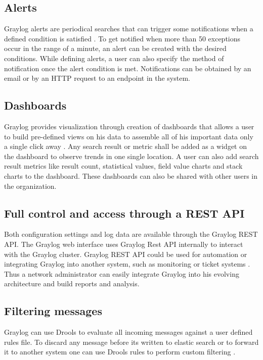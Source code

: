 \documentclass[9pt,twocolumn,twoside]{../../styles/osajnl}
\begin{document}
\subsection{Alerts}

Graylog alerts are periodical searches that can trigger some
notifications when a defined condition is satisfied
\cite{www-graylog-alerts}. To get notified when more than 50
exceptions occur in the range of a minute, an alert can be created
with the desired conditions.  While defining alerts, a user can also
specify the method of notification once the alert condition is
met. Notifications can be obtained by an email or by an HTTP request
to an endpoint in the system.

\subsection{Dashboards}

Graylog provides visualization through creation of dashboards that
allows a user to build pre-defined views on his data to assemble all
of his important data only a single click away
\cite{www-graylog-dashboards}. Any search result or metric shall be
added as a widget on the dashboard to observe trends in one single
location.  A user can also add search result metrics like result
count, statistical values, field value charts and stack charts to the
dashboard. These dashboards can also be shared with other users in the
organization.

\subsection{Full control and access through a REST API}

Both configuration settings and log data are available through the
Graylog REST API.  The Graylog web interface uses Graylog Rest API
internally to interact with the Graylog cluster. Graylog REST API
could be used for automation or integrating Graylog into another
system, such as monitoring or ticket systems
\cite{www-graylog-restapi}. Thus a network administrator can easily
integrate Graylog into his evolving architecture and build reports and
analysis.

\subsection{Filtering messages}

Graylog can use Drools \CE to evaluate all incoming messages against a
user defined rules file. To discard any message before its written to
elastic search or to forward it to another system one can use Drools
rules to perform custom filtering \cite{www-graylog-blacklisting}.
\end{document}

